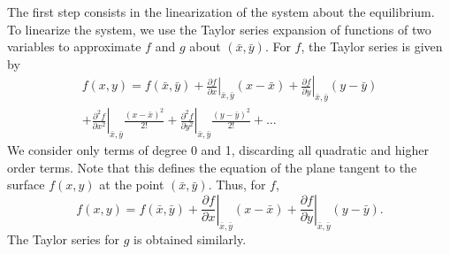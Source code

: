 The first step consists in the  linearization of the system about the equilibrium.
To linearize the system, we use the Taylor series expansion of functions of two variables to approximate $f$ and $g$ about $(\bar x, \bar y)$. For $f$, the Taylor series is given by
\begin{multline*}
f(x,y)= f(\bar x,\bar y)+\left .\frac{\partial f}{\partial x}\right |_{\bar x,\bar y}(x-\bar x)+ \left .\frac{\partial f}{\partial y}\right |_{\bar x,\bar y}(y-\bar y)\\
+ \left .\frac{\partial^2 f}{\partial x^2}\right |_{\bar x,\bar y}\frac{(x-\bar x)^2}{2!} + \left .\frac{\partial^2 f}{\partial y^2}\right |_{\bar x,\bar y}\frac{(y-\bar y)^2}{2!}+\dots
\end{multline*}
We consider only terms of degree 0 and 1, discarding all quadratic and higher order terms. Note that this defines the equation of the plane tangent to the surface $f(x,y)$ at the point $(\bar x,\bar y)$. Thus, for $f$,
$$f(x,y)= f(\bar x,\bar y)+\left .\frac{\partial f}{\partial x}\right |_{\bar x,\bar y}(x-\bar x)+ \left .\frac{\partial f}{\partial y}\right |_{\bar x,\bar y}(y-\bar y).$$
The Taylor series for $g$ is obtained similarly. 

